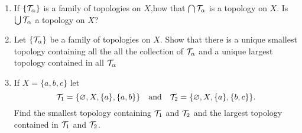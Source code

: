 \begin{ex}{13.4}
    ${}$
    \begin{enumerate}
        \item If $\{\mathcal{T}_\alpha\}$ is a family of topologies on $X$,how that $\bigcap\mathcal{T}_\alpha$ is a topology on $X$. Is $\bigcup\mathcal{T}_\alpha$ a topology on $X$?
        \item Let $\{\mathcal{T}_\alpha\}$ be a family of topologies on $X$. Show that there is a unique smallest topology containing all the all the collection of $\mathcal{T}_\alpha$ and a unique largest topology contained in all $\mathcal{T}_\alpha$
        \item If $X=\{a,b,c\}$ let
            $$
                \mathcal{T}_1 = \{\varnothing, X, \{a\}, \{a,b\}\}\quad\text{and}\quad\mathcal{T}_2=\{\varnothing, X,\{a\}, \{b,c\}\}.
            $$
            Find the smallest topology containing $\mathcal{T}_1$ and $\mathcal{T}_2$ and the largest topology contained in $\mathcal{T}_1$ and $\mathcal{T}_2$.
    \end{enumerate}
\end{ex}
